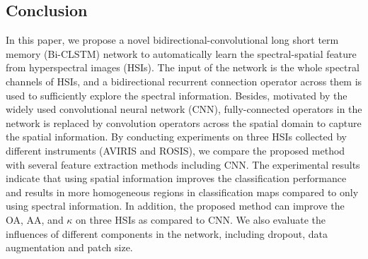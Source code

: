 \documentclass[12pt,onecolumn]{IEEEtran}
\begin{document}
\begin{spacing}{2}
\section{Conclusion}
In this paper, we propose a novel bidirectional-convolutional long short term memory (Bi-CLSTM) network to automatically learn the spectral-spatial feature from hyperspectral images (HSIs). The input of  the network is the whole spectral channels of HSIs, and a bidirectional recurrent connection operator across them is used to sufficiently explore the spectral information. Besides, motivated by the widely used convolutional neural network (CNN), fully-connected operators in the network is replaced by convolution operators across the spatial domain to capture the spatial information. By conducting experiments on
three HSIs collected by different instruments (AVIRIS and ROSIS), we compare the proposed method with several feature extraction methods including CNN. The experimental results indicate that using spatial
information improves the classification performance and results in more homogeneous regions in classification maps compared to only using spectral information. In addition, the proposed
method can improve the OA, AA, and $\kappa$ on three HSIs as compared to CNN. We also evaluate the influences of different components in the network, including dropout, data augmentation and patch size.



\end{spacing}
\end{document}

